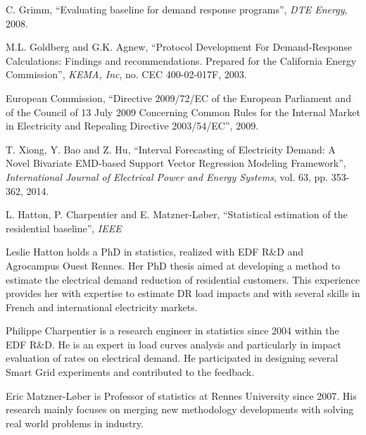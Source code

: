 \documentclass[journal]{IEEEtran}
\begin{document}
\begin{thebibliography}{1}
C. Grimm, ``Evaluating baseline for demand response programs'', \emph{DTE Energy}, 2008.

M.L. Goldberg and G.K. Agnew, ``Protocol Development For Demand-Response Calculations: Findings and recommendations. Prepared for the California Energy Commission'', \emph{KEMA, Inc}, no. CEC 400-02-017F, 2003.

European Commission, ``Directive 2009/72/EC of the European Parliament and of the Council of 13 July 2009 Concerning Common Rules for the Internal Market in Electricity and Repealing Directive 2003/54/EC'', 2009. 

T. Xiong, Y. Bao and Z. Hu, ``Interval Forecasting of Electricity Demand: A Novel Bivariate EMD-based Support Vector Regression Modeling Framework'', \emph{International Journal of Electrical Power and Energy Systems}, vol. 63, pp. 353-362, 2014.

L. Hatton, P. Charpentier and E. Matzner-L{\o}ber, ``Statistical estimation of the residential
baseline'', \emph{IEEE}
 

\end{thebibliography}

\vspace*{-7cm}\begin{IEEEbiographynophoto}{Leslie Hatton}
holds a PhD in statistics, realized with EDF R\&D and 
Agrocampus Ouest Rennes. Her PhD thesis aimed at developing a method to estimate the electrical demand 
reduction of residential customers. This experience provides her with expertise to estimate DR 
load impacts and with several skills in French and international electricity markets. 
\end{IEEEbiographynophoto}

\vspace*{-7cm}\begin{IEEEbiographynophoto}{Philippe Charpentier}
is a research engineer in statistics since 2004 within the EDF R\&D. He is an expert in load curves 
analysis and particularly in impact evaluation of rates on electrical demand. He participated in 
designing several Smart Grid experiments and contributed to the feedback.
\end{IEEEbiographynophoto}

\vspace*{-7cm}\begin{IEEEbiographynophoto}{Eric Matzner-L{\o}ber}
is Professor of statistics at Rennes University since 2007. His research 
mainly focuses on merging new methodology developments with solving real 
world problems in industry.
\end{IEEEbiographynophoto}
\end{document}
